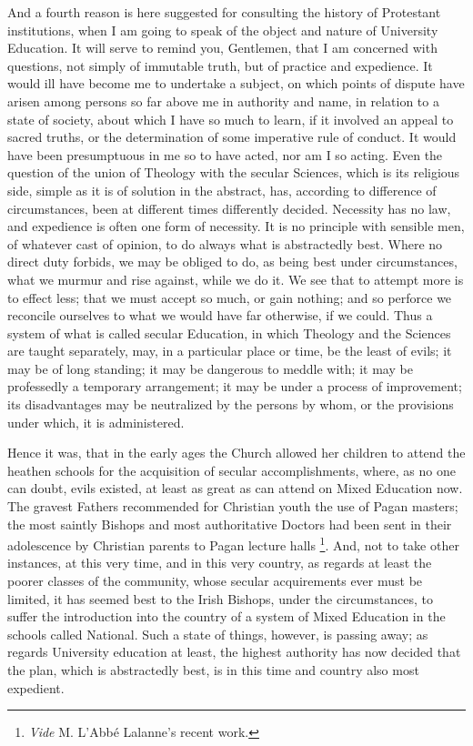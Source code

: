 And a fourth reason is here suggested for consulting the history of
Protestant institutions, when I am going to speak of the object and
nature of University Education. It will serve to remind you,
Gentlemen, that I am concerned with questions, not simply of immutable
truth, but of practice and expedience. It would ill have become me to
undertake a subject, on which points of dispute have arisen among
persons so far above me in authority and name, in relation to a state
of society, about which I have so much to learn, if it involved an
appeal to sacred truths, or the determination of some imperative rule
of conduct. It would have been presumptuous in me so to have acted,
nor am I so acting. Even the question of the union of Theology with
the secular Sciences, which is its religious side, simple as it is of
solution in the abstract, has, according to difference of
circumstances, been at different times differently decided. Necessity
has no law, and expedience is often one form of necessity. It is no
principle with sensible men, of whatever cast of opinion, to do
always what is abstractedly best. Where no direct duty forbids, we may
be obliged to do, as being best under circumstances, what we murmur
and rise against, while we do it. We see that to attempt more is to
effect less; that we must accept so much, or gain nothing; and so
perforce we reconcile ourselves to what we would have far otherwise,
if we could. Thus a system of what is called secular Education, in
which Theology and the Sciences are taught separately, may, in a
particular place or time, be the least of evils; it may be of long
standing; it may be dangerous to meddle with; it may be professedly a
temporary arrangement; it may be under a process of improvement; its
disadvantages may be neutralized by the persons by whom, or the
provisions under which, it is administered.

Hence it was, that in the early ages the Church allowed her
children to attend the heathen schools for the acquisition of secular
accomplishments, where, as no one can doubt, evils existed, at least
as great as can attend on Mixed Education now. The gravest Fathers
recommended for Christian youth the use of Pagan masters; the most
saintly Bishops and most authoritative Doctors had been sent in their
adolescence by Christian parents to Pagan lecture halls \footnote{\emph{Vide} M. L'Abbé Lalanne's recent work.}. And, not to take other instances, at this very time, and in
this very country, as regards at least the poorer classes of the
community, whose secular acquirements ever must be limited, it has
seemed best to the Irish Bishops, under the circumstances, to suffer
the introduction into the country of a system of Mixed Education in
the schools called National. Such a state of things, however, is
passing away; as regards University education at least, the
highest authority has now decided that the plan, which is abstractedly
best, is in this time and country also most expedient.

